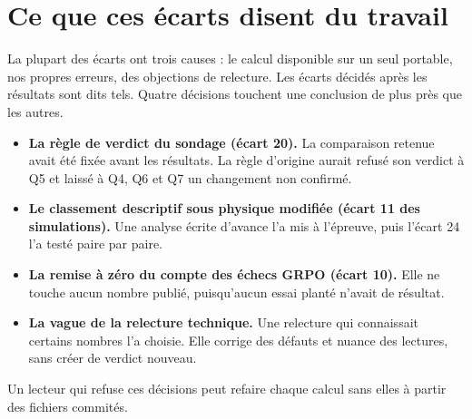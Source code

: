 \section{Ce que ces écarts disent du travail}
\label{sec:ecarts-bilan}

La plupart des écarts ont trois causes : le calcul disponible sur un seul portable, nos propres
erreurs, des objections de relecture. Les écarts décidés après les résultats sont dits tels. Quatre
décisions touchent une conclusion de plus près que les autres.
\begin{itemize}
  \item \textbf{La règle de verdict du sondage (écart 20).} La comparaison retenue avait été fixée
        avant les résultats. La règle d'origine aurait refusé son verdict à Q5 et laissé à Q4, Q6
        et Q7 un changement non confirmé.
  \item \textbf{Le classement descriptif sous physique modifiée (écart 11 des simulations).} Une
        analyse écrite d'avance l'a mis à l'épreuve, puis l'écart 24 l'a testé paire par paire.
  \item \textbf{La remise à zéro du compte des échecs GRPO (écart 10).} Elle ne touche aucun nombre
        publié, puisqu'aucun essai planté n'avait de résultat.
  \item \textbf{La vague de la relecture technique.} Une relecture qui connaissait certains nombres l'a choisie.
        Elle corrige des défauts et nuance des lectures, sans créer de verdict nouveau.
\end{itemize}
Un lecteur qui refuse ces décisions peut refaire chaque calcul sans elles à partir des fichiers
commités.

